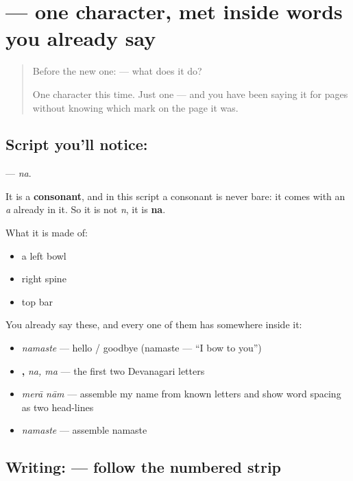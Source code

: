 \section[\texorpdfstring{\hi{न} (na)}{न (na)}]{ — one character, met inside words you already say}

\label{lesson:HI-S02-letter-na}



\begin{quote}
Before the new one:  — what does it do?

One character this time. Just one — and you have been saying it for pages without knowing which mark on the page it was.
\end{quote}

\subsection*{Script you'll notice: }
\textbf{} — \emph{na}.

It is a \textbf{consonant}, and in this script a consonant is never bare: it comes with an \emph{a} already in it. So it is not \emph{n}, it is \textbf{na}.

What it is made of:

\begin{itemize}
\raggedright
  \item a left bowl
  \item right spine
  \item top bar
\end{itemize}

You already say these, and every one of them has  somewhere inside it:

\begin{itemize}
\raggedright
  \item \textbf{} \emph{namaste} — hello / goodbye (namaste — \textquotedblleft{}I bow to you\textquotedblright{})
  \item \textbf{, } \emph{na, ma} — the first two Devanagari letters
  \item \textbf{ } \emph{merā nām} — assemble my name from known letters and show word spacing as two head-lines
  \item \textbf{} \emph{namaste} — assemble namaste
\end{itemize}

\subsection*{Writing:  — follow the numbered strip}

